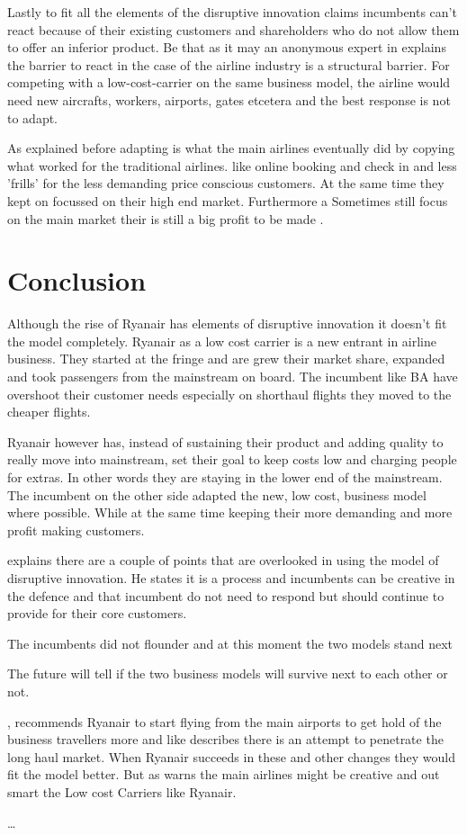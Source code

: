 \documentclass[a4paper, 11pt]{article}
\begin{document}
Lastly to fit all the elements of the disruptive innovation \cite{Christensen97} claims incumbents can't react because of their existing customers and shareholders who do not allow them to offer an inferior product.
Be that as it may an anonymous expert in \cite{King} explains the barrier to react in the case of the airline industry is a structural barrier. For competing with a low-cost-carrier on the same business model, the airline would need new aircrafts, workers, airports, gates etcetera and the best response is not to adapt.

As explained before adapting is what the main airlines eventually did by copying what worked for the traditional airlines. like online booking and check in and less 'frills' for the less demanding price conscious customers. At the same time they kept on focussed on their high end market. Furthermore a  Sometimes still focus on the main market their is still a big profit to be made \cite{Christensen2015}.


\section{Conclusion}

Although the rise of Ryanair has elements of disruptive innovation it doesn't fit the model completely. Ryanair as a low cost carrier is a new entrant in airline business. They started at the fringe and are grew their market share, expanded and took passengers from the mainstream on board. The incumbent like BA have overshoot their customer needs especially on shorthaul flights they moved to the cheaper flights.

Ryanair however has, instead of sustaining their product and adding quality to really move into mainstream, set their goal to keep costs low and charging people for extras. In other words they are staying in the lower end of the mainstream. The incumbent on the other side adapted the new, low cost, business model where possible. While at the same time keeping their more demanding and more profit making customers.

\cite{Christensen2015} explains there are a couple of points that are overlooked in using the model of disruptive innovation. He states it is a process and incumbents can be creative in the defence and that incumbent do not need to respond but should continue to provide for their core customers.

The incumbents did not flounder and at this moment the two models stand next

The future will tell if the two business models will survive next to each other or not.

\cite{Diaconu}, recommends Ryanair to start flying from the main airports to get hold of the business travellers more and like \cite{Eurocontrol2018} describes there is an attempt to penetrate the long haul market. When Ryanair succeeds in these and other changes they would fit the model better. But as \cite{Christensen2015} warns the main airlines might be creative and out smart the Low cost Carriers like Ryanair.

\ldots


\renewcommand{\textbf}{}
\renewcommand{\bf}{}
{}
\end{document}
